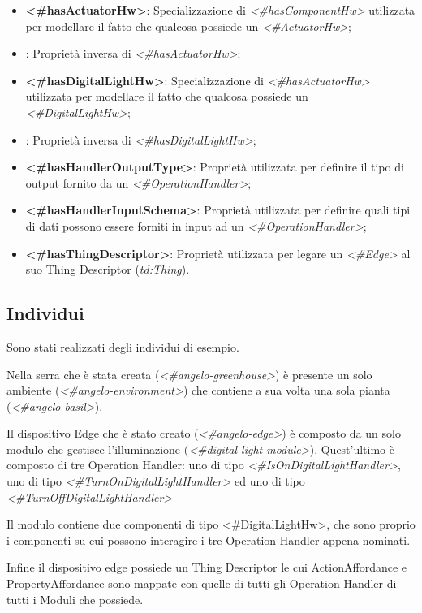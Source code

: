 \begin{itemize}
	\item \textbf{<\#hasActuatorHw>}: Specializzazione di \textit{<\#hasComponentHw>} utilizzata per modellare il fatto che qualcosa possiede un \textit{<\#ActuatorHw>};

	\item {}: Proprietà inversa di \textit{<\#hasActuatorHw>};

	\item \textbf{<\#hasDigitalLightHw>}: Specializzazione di \textit{<\#hasActuatorHw>} utilizzata per modellare il fatto che qualcosa possiede un \textit{<\#DigitalLightHw>};

	\item {}: Proprietà inversa di \textit{<\#hasDigitalLightHw>};

	\item \textbf{<\#hasHandlerOutputType>}: Proprietà utilizzata per definire il tipo di output fornito da un \textit{<\#OperationHandler>};

	\item \textbf{<\#hasHandlerInputSchema>}: Proprietà utilizzata per definire quali tipi di dati possono essere forniti in input ad un \textit{<\#OperationHandler>};

	\item \textbf{<\#hasThingDescriptor>}: Proprietà utilizzata per legare un \textit{<\#Edge>} al suo Thing Descriptor (\textit{td:Thing}).
\end{itemize}

\subsection{Individui}
Sono stati realizzati degli individui di esempio.

\noindent Nella serra che è stata creata (\textit{<\#angelo-greenhouse>}) è presente un solo ambiente (\textit{<\#angelo-environment>}) che contiene a sua volta una sola pianta (\textit{<\#angelo-basil>}).

\noindent Il dispositivo Edge che è stato creato (\textit{<\#angelo-edge>}) è composto da un solo modulo che gestisce l'illuminazione (\textit{<\#digital-light-module>}). Quest'ultimo è composto di tre Operation Handler: uno di tipo \textit{<\#IsOnDigitalLightHandler>}, uno di tipo \textit{<\#TurnOnDigitalLightHandler>} ed uno di tipo \textit{<\#TurnOffDigitalLightHandler>}

\noindent Il modulo contiene due componenti di tipo <\#DigitalLightHw>, che sono proprio i componenti su cui possono interagire i tre Operation Handler appena nominati.

\noindent Infine il dispositivo edge possiede un Thing Descriptor le cui ActionAffordance e PropertyAffordance sono mappate con quelle di tutti gli Operation Handler di tutti i Moduli che possiede.
